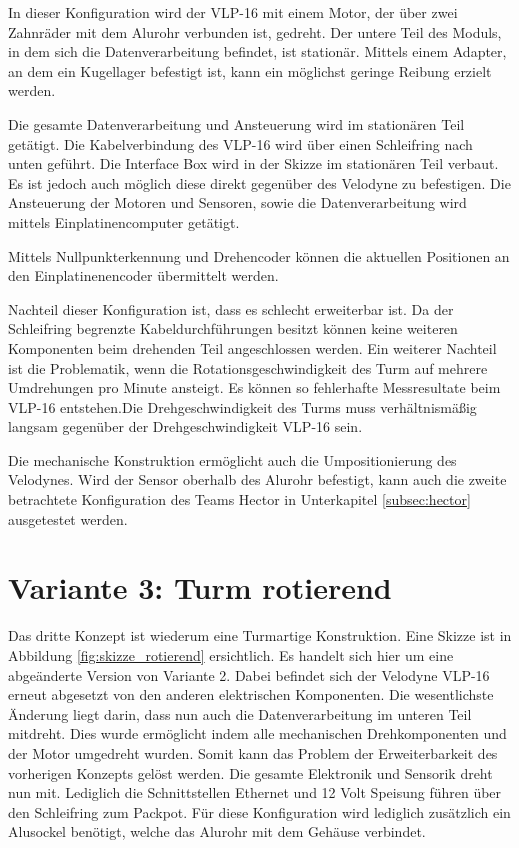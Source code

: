 In dieser Konfiguration wird der VLP-16 mit einem Motor, der über zwei Zahnräder mit dem Alurohr verbunden ist, gedreht. Der untere Teil des Moduls, in dem sich die Datenverarbeitung befindet, ist stationär. Mittels einem Adapter, an dem ein Kugellager befestigt ist, kann ein möglichst geringe Reibung erzielt werden.

Die gesamte Datenverarbeitung und Ansteuerung wird im stationären Teil getätigt. Die Kabelverbindung des VLP-16 wird über einen Schleifring nach unten geführt. Die Interface Box wird in der Skizze im stationären Teil verbaut. Es ist jedoch auch möglich diese direkt gegenüber des Velodyne zu befestigen. Die Ansteuerung der Motoren und Sensoren, sowie die Datenverarbeitung wird mittels Einplatinencomputer getätigt.

Mittels Nullpunkterkennung und Drehencoder können die aktuellen Positionen an den Einplatinenencoder übermittelt werden.

Nachteil dieser Konfiguration ist, dass es schlecht erweiterbar ist. Da der Schleifring begrenzte Kabeldurchführungen besitzt können keine weiteren Komponenten beim drehenden Teil angeschlossen werden. Ein weiterer Nachteil ist die Problematik, wenn die Rotationsgeschwindigkeit des Turm auf mehrere Umdrehungen pro Minute ansteigt. Es können so fehlerhafte Messresultate beim VLP-16 entstehen.Die Drehgeschwindigkeit des Turms muss verhältnismäßig langsam gegenüber der Drehgeschwindigkeit VLP-16 sein.

Die mechanische Konstruktion ermöglicht auch die Umpositionierung des Velodynes. Wird der Sensor oberhalb des Alurohr befestigt, kann auch die zweite betrachtete Konfiguration des Teams Hector in Unterkapitel \ref{subsec:hector} ausgetestet werden.

\section {Variante 3: Turm rotierend}
\label{sec:var3}
Das dritte Konzept ist wiederum eine Turmartige Konstruktion. Eine Skizze ist in Abbildung \ref{fig:skizze_rotierend} ersichtlich. Es handelt sich hier um eine abgeänderte Version von Variante 2. Dabei befindet sich der Velodyne VLP-16 erneut abgesetzt von den anderen elektrischen Komponenten. Die wesentlichste Änderung liegt darin, dass nun auch die Datenverarbeitung im unteren Teil mitdreht. 
Dies wurde ermöglicht indem alle mechanischen Drehkomponenten und der Motor umgedreht wurden. Somit kann das Problem der Erweiterbarkeit des vorherigen Konzepts gelöst werden. Die gesamte Elektronik und Sensorik dreht nun mit. Lediglich die Schnittstellen Ethernet und 12 Volt Speisung führen über den Schleifring zum Packpot. Für diese Konfiguration wird lediglich zusätzlich ein Alusockel benötigt, welche das Alurohr mit dem Gehäuse verbindet. 


